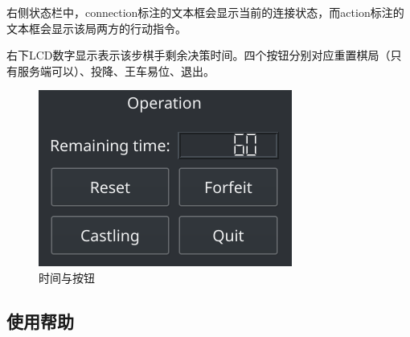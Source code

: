 \documentclass[a4paper,10pt]{article}
\begin{document}
右侧状态栏中，connection标注的文本框会显示当前的连接状态，而action标注的文本框会显示该局两方的行动指令。\par
右下LCD数字显示表示该步棋手剩余决策时间。四个按钮分别对应重置棋局（只有服务端可以）、投降、王车易位、退出。\par
\begin{figure}[htbp]
 \centering
 \includegraphics[width=.3\textwidth]{buttons.png}
 \caption{时间与按钮}
 \label{fig4}
\end{figure}
        \subsection{使用帮助}
\end{document}
